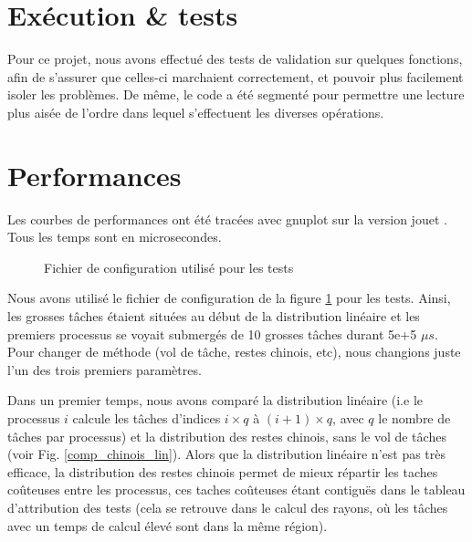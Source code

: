 \section{Exécution \& tests} %
\label{sec:execution}

Pour ce projet, nous avons effectué des tests de validation sur quelques fonctions, afin de s'assurer que celles-ci marchaient correctement, et pouvoir plus facilement isoler les problèmes. 
De même, le code a été segmenté pour permettre une lecture plus aisée de l'ordre dans lequel s'effectuent les diverses opérations.

\section{Performances} %
\label{sec:perf}

Les courbes de performances ont été tracées avec gnuplot sur la version \og jouet \fg. Tous les temps sont en microsecondes.

\begin{figure}[H]
\centering

\caption{Fichier de configuration utilisé pour les tests}
\label{fig:conf}
\end{figure}
Nous avons utilisé le fichier de configuration de la figure \ref{fig:conf} pour les tests. Ainsi, les grosses tâches étaient situées au début de la distribution linéaire et les premiers processus se voyait submergés de 10 grosses tâches durant 5e+5 $\mu s$. Pour changer de méthode (vol de tâche, restes chinois, etc), nous changions juste l'un des trois premiers paramètres. 

Dans un premier temps, nous avons comparé la distribution linéaire (i.e le processus $i$ calcule les tâches d'indices $i \times q$ à $(i+1) \times q$, avec $q$ le nombre de tâches par processus) et la distribution des restes chinois, sans le vol de tâches (voir Fig. \ref{comp_chinois_lin}). Alors que la distribution linéaire n'est pas très efficace, la distribution des restes chinois permet de mieux répartir les taches coûteuses entre les processus, ces taches coûteuses étant contiguës dans le tableau d'attribution des tests (cela se retrouve dans le calcul des rayons, où les tâches avec un temps de calcul élevé sont dans la même région).\\

